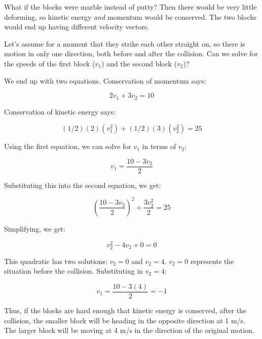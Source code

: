 What if the blocks were marble instead of putty?  Then there would be
very little deforming, so kinetic energy \emph{and} momentum would be
conserved. The two blocks would end up having different velocity
vectors.

Let's assume for a moment that they strike each other straight on, so
there is motion in only one direction, both before and after the
collision.  Can we solve for the speeds of the first block ($v_1$) and
the second block ($v_2$)?

We end up with two equations. Conservation of momentum says:

$$2 v_1 + 3 v_2 = 10$$

Conservation of kinetic energy says:

$$(1/2)(2)(v_1^2) + (1/2)(3)(v_2^2) = 25$$

Using the first equation, we can solve for $v_1$ in terms of $v_2$:

$$v_1 = \frac{10 - 3 v_2}{2}$$

Substituting this into the second equation, we get:

$$\left(\frac{10 - 3 v_2}{2}\right)^2 + \frac{3 v_2^2}{2} = 25$$

Simplifying, we get:

$$v_2^2 - 4 v_2 + 0 = 0$$

This quadratic has two solutions: $v_2 = 0$ and $v_2 = 4$.  $v_2 = 0$
represents the situation before the collision.  Substituting in $v_2 = 4$:

$$v_1 = \frac{10 - 3(4)}{2} = -1$$

Thus, if the blocks are hard enough that kinetic energy is conserved,
after the collision, the smaller block will be heading in the opposite
direction at 1 m/s. The larger block will be moving at 4 m/s in the
direction of the original motion.

